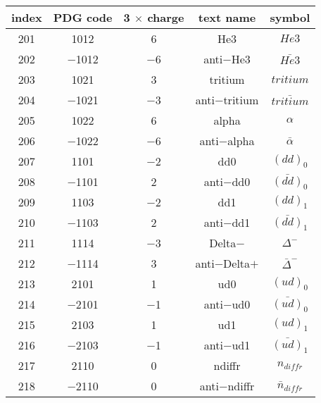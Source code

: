 \documentclass{article}
\begin{document}
\clearpage

\begin{table}[!htbp]
\centering
\begin{tabular}{|c|c|c|c|c|}
\hline
index & PDG code & 3 $\times$ charge & text name & symbol \\
\hline
201 & 1012 & 6 & He3 & $He3$ \\
\hline
202 & $-$1012 & $-$6 & anti$-$He3 & $\bar{He3}$ \\
\hline
203 & 1021 & 3 & tritium & $tritium$ \\
\hline
204 & $-$1021 & $-$3 & anti$-$tritium & $\bar{tritium}$ \\
\hline
205 & 1022 & 6 & alpha & $\alpha$ \\
\hline
206 & $-$1022 & $-$6 & anti$-$alpha & $\bar{\alpha}$ \\
\hline
207 & 1101 & $-$2 & dd\underline{\hspace{0.6em}}0 & $(dd)_{0}$ \\
\hline
208 & $-$1101 & 2 & anti$-$dd\underline{\hspace{0.6em}}0 & $\bar{(dd)}_{0}$ \\
\hline
209 & 1103 & $-$2 & dd\underline{\hspace{0.6em}}1 & $(dd)_{1}$ \\
\hline
210 & $-$1103 & 2 & anti$-$dd\underline{\hspace{0.6em}}1 & $\bar{(dd)}_{1}$ \\
\hline
211 & 1114 & $-$3 & Delta$-$ & $\Delta^{-}$ \\
\hline
212 & $-$1114 & 3 & anti$-$Delta$+$ & $\bar{\Delta}^{-}$ \\
\hline
213 & 2101 & 1 & ud\underline{\hspace{0.6em}}0 & $(ud)_{0}$ \\
\hline
214 & $-$2101 & $-$1 & anti$-$ud\underline{\hspace{0.6em}}0 & $\bar{(ud)}_{0}$ \\
\hline
215 & 2103 & 1 & ud\underline{\hspace{0.6em}}1 & $(ud)_{1}$ \\
\hline
216 & $-$2103 & $-$1 & anti$-$ud\underline{\hspace{0.6em}}1 & $\bar{(ud)}_{1}$ \\
\hline
217 & 2110 & 0 & n\underline{\hspace{0.6em}}diffr & $n_{diffr}$ \\
\hline
218 & $-$2110 & 0 & anti$-$n\underline{\hspace{0.6em}}diffr & $\bar{n}_{diffr}$ \\

\end{tabular}
\end{table}
\end{document}
